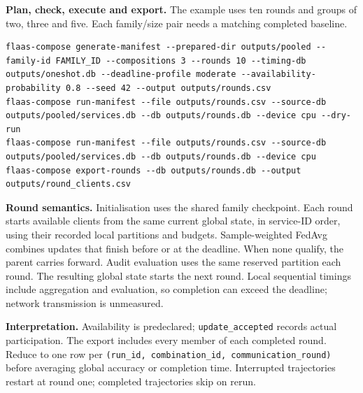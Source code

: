 \documentclass[10pt,a4paper]{article}
\newcommand{\code}[1]{\nolinkurl{#1}}
\newcommand{\lead}[1]{\par\smallskip\noindent\textbf{#1}\enspace}
\begin{document}
\lead{Plan, check, execute and export.} The example uses ten rounds and groups of two, three and five. Each family/size pair needs a matching completed baseline.
\begin{lstlisting}
flaas-compose generate-manifest --prepared-dir outputs/pooled --family-id FAMILY_ID --compositions 3 --rounds 10 --timing-db outputs/oneshot.db --deadline-profile moderate --availability-probability 0.8 --seed 42 --output outputs/rounds.csv
flaas-compose run-manifest --file outputs/rounds.csv --source-db outputs/pooled/services.db --db outputs/rounds.db --device cpu --dry-run
flaas-compose run-manifest --file outputs/rounds.csv --source-db outputs/pooled/services.db --db outputs/rounds.db --device cpu
flaas-compose export-rounds --db outputs/rounds.db --output outputs/round_clients.csv
\end{lstlisting}
\lead{Round semantics.} Initialisation uses the shared family checkpoint. Each round starts available clients from the same current global state, in service-ID order, using their recorded local partitions and budgets. Sample-weighted FedAvg combines updates that finish before or at the deadline. When none qualify, the parent carries forward. Audit evaluation uses the same reserved partition each round. The resulting global state starts the next round. Local sequential timings include aggregation and evaluation, so completion can exceed the deadline; network transmission is unmeasured.

\lead{Interpretation.} Availability is predeclared; \code{update_accepted} records actual participation. The export includes every member of each completed round. Reduce to one row per \code{(run_id, combination_id, communication_round)} before averaging global accuracy or completion time. Interrupted trajectories restart at round one; completed trajectories skip on rerun.
\end{document}
